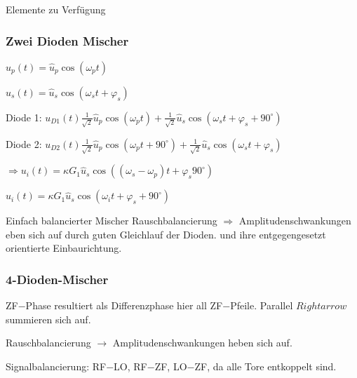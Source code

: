 Elemente zu Verfügung
\begin{pitemize}
    \item {}
    \item {}
    \item {}
    \item {}
\end{pitemize}



\subsubsection{Zwei Dioden Mischer}




$u_p(t) = \hat{u}_p \cos(\omega_p t)$

$u_s(t) = \hat{u}_s \cos(\omega_s t + \varphi_s)$

Diode 1: $u_{D1}(t) \frac{1}{\sqrt{2}} \hat{u}_p \cos(\omega_p t) + \frac{1}{\sqrt{2}} \hat{u}_s \cos(\omega_s t + \varphi_s + 90^\circ)$

Diode 2: $u_{D2}(t) \frac{1}{\sqrt{2}} \hat{u}_p \cos(\omega_p t + 90^\circ) + \frac{1}{\sqrt{2}} \hat{u}_s \cos(\omega_s t + \varphi_s)$

$\Rightarrow u_i(t) = \kappa G_1 \hat{u}_s \cos\left((\omega_s - \omega_p)t + \varphi_s  90^\circ\right)$

$u_i(t) = \kappa G_1 \hat{u}_s \cos\left( \omega_i t + \varphi_s + 90^\circ\right)$


Einfach balancierter Mischer
Rauschbalancierung $\Rightarrow$ Amplitudenschwankungen eben sich auf durch guten Gleichlauf der Dioden.
und ihre entgegengesetzt orientierte Einbaurichtung.

\subsubsection{4-Dioden-Mischer}



ZF$-$Phase resultiert als Differenzphase hier all ZF$-$Pfeile.
Parallel $Rightarrow$ summieren sich auf.
\begin{pitemize}
    \item Rauschbalancierung $\rightarrow$ Amplitudenschwankungen heben sich auf.
    \item Signalbalancierung: RF$-$LO, RF$-$ZF, LO$-$ZF, da alle Tore entkoppelt sind.
\end{pitemize}


